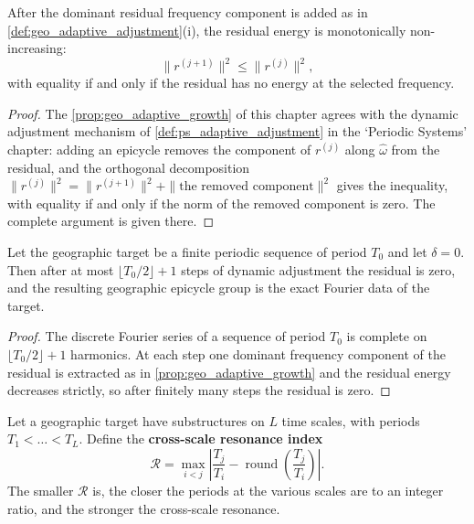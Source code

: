 \begin{proposition}\label{prop:geo_adaptive_growth}
After the dominant residual frequency component is added as in \cref{def:geo_adaptive_adjustment}(i), the residual energy is monotonically non-increasing:
\[
\|r^{(j+1)}\|^2\le\|r^{(j)}\|^2,
\]
with equality if and only if the residual has no energy at the selected frequency.
\end{proposition}

\begin{proof}
The \cref{prop:geo_adaptive_growth} of this chapter agrees with the dynamic adjustment mechanism of \cref{def:ps_adaptive_adjustment} in the `Periodic Systems' chapter:
adding an epicycle removes the component of $r^{(j)}$ along $\hat\omega$ from the residual, and the orthogonal decomposition
$\|r^{(j)}\|^2=\|r^{(j+1)}\|^2+\|\text{the removed component}\|^2$ gives the inequality,
with equality if and only if the norm of the removed component is zero. The complete argument is given there.
\end{proof}

\begin{theorem}\label{thm:geo_adaptive_convergence}
Let the geographic target be a finite periodic sequence of period $T_0$ and let $\delta=0$. Then after at most $\lfloor T_0/2\rfloor+1$ steps of dynamic adjustment the residual is zero, and the resulting geographic epicycle group is the exact Fourier data of the target.
\end{theorem}

\begin{proof}
The discrete Fourier series of a sequence of period $T_0$ is complete on $\lfloor T_0/2\rfloor+1$ harmonics. At each step one dominant frequency component of the residual is extracted as in \cref{prop:geo_adaptive_growth} and the residual energy decreases strictly, so after finitely many steps the residual is zero.
\end{proof}

\begin{definition}\label{def:geo_cross_scale_resonance}
Let a geographic target have substructures on $L$ time scales, with periods $T_1<\dots<T_L$. Define the \textbf{cross-scale resonance index}
\[
\mathcal R=\max_{i<j}\left|\frac{T_j}{T_i}-\operatorname{round}\left(\frac{T_j}{T_i}\right)\right|.
\]
The smaller $\mathcal R$ is, the closer the periods at the various scales are to an integer ratio, and the stronger the cross-scale resonance.
\end{definition}

